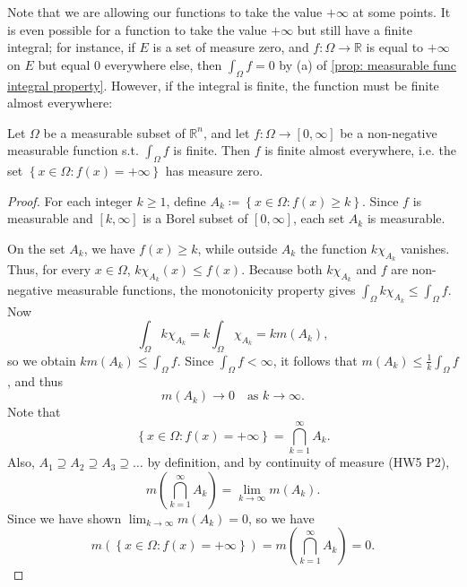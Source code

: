 Note that we are allowing our functions to take the value \(+ \infty\) at some points. It is even possible for a function to take the value \(+ \infty\) but still have a finite integral; for instance, if \(E\) is a set of measure zero, and \(f: \Omega \to \mathbb{R} \) is equal to \(+\infty \) on \(E\) but equal \(0\) everywhere else, then \(\int _\Omega f = 0\) by (a) of \autoref{prop: measurable func integral property}. However, if the integral is finite, the function must be finite almost everywhere:

\begin{lemma} \label{lm: finite integral implies infty set has measure 0}
    Let \(\Omega \) be a measurable subset of \(\mathbb{R} ^n\), and let \(f: \Omega \to [0, \infty]\) be a non-negative measurable function s.t. \(\int _\Omega f\) is finite. Then \(f\) is finite almost everywhere, i.e. the set \(\left\{ x \in \Omega : f(x) = + \infty  \right\} \) has measure zero.      
\end{lemma}

\begin{proof}
    For each integer \(k \ge 1\), define \(A_k \coloneqq \left\{ x \in \Omega: f(x) \ge k \right\} \). Since \(f\) is measurable and \([k, \infty]\) is a Borel subset of \([0, \infty]\), each set \(A_k\) is measurable. 

    On the set \(A_k\), we have \(f(x) \ge k\), while outside \(A_k\) the function \(k \chi _{A_k}\) vanishes. Thus, for every \(x \in \Omega\), \(k \chi _{A_k}(x) \le f(x)\). Because both \(k \chi _{A_k}\) and \(f\) are non-negative measurable functions, the monotonicity property gives \(\int _\Omega k \chi _{A_k} \le \int _\Omega f\). Now 
    \[
        \int _\Omega k \chi _{A_k} = k \int _\Omega \chi _{A_k} = k m(A_k),
    \]                
    so we obtain \(k m(A_k) \le \int _\Omega f\). Since \(\int _\Omega f < \infty\), it follows that \(m(A_k) \le \frac{1}{k} \int _\Omega f\), and thus 
    \[
        m(A_k) \to 0 \quad \text{as } k \to \infty. 
    \]   
    Note that 
    \[
        \left\{ x \in \Omega: f(x) = +\infty \right\} = \bigcap_{k=1}^{\infty} A_k.  
    \]
    Also, \(A_1 \supseteq A_2 \supseteq A_3 \supseteq \dots \) by definition, and by continuity of measure (HW5 P2),
    \[
        m \left( \bigcap_{k=1}^{\infty} A_k  \right) = \lim_{k \to \infty} m(A_k).  
    \]
    Since we have shown \(\lim_{k \to \infty} m(A_k) = 0 \), so we have 
    \[
        m\left( \left\{ x \in \Omega : f(x) = +\infty \right\}  \right) = m \left( \bigcap_{k=1}^{\infty} A_k  \right) = 0.  
    \] 
\end{proof}

